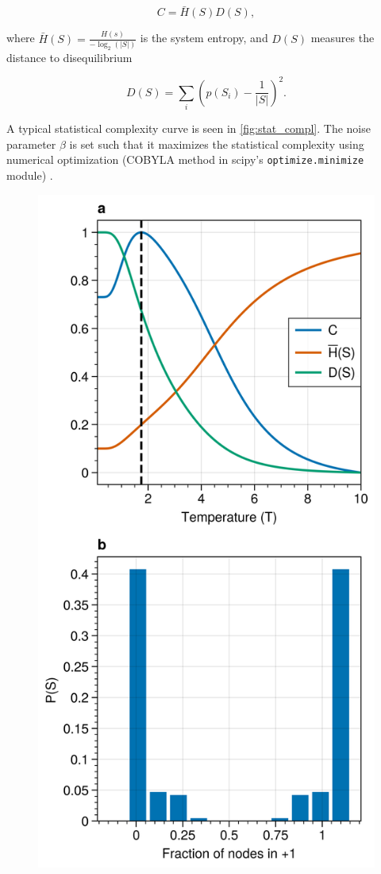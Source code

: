 \documentclass[a4paper, 11pt, twocolumn]{article}
\begin{document}
\begin{equation}
C = \bar H(S) D(S),
\end{equation}

where $\bar H(S) = \frac{H(s)}{-\log_2(|S|)}$ is the system  entropy, and $D(S)$ measures the
distance to disequilibrium

\begin{equation}
D(S) = \sum_i (p(S_i) - \frac{1}{|S|})^2.
\end{equation}

A   typical  statistical   complexity  curve   is  seen   in
\cref{fig:stat_compl}. The noise parameter $\beta$ is set such that
it  maximizes  the  statistical complexity  using  numerical
optimization (COBYLA method in scipy's \texttt{optimize.minimize}
module) \cite{Virtanen2020}.

\begin{figure}[htbp]
\centering
\includegraphics[width=.9\linewidth]{./figures/exact_kite_dyn=ising_beta=0.5732374683235916_T=200_statistical_complexity.png}

\end{figure}
\end{document}
